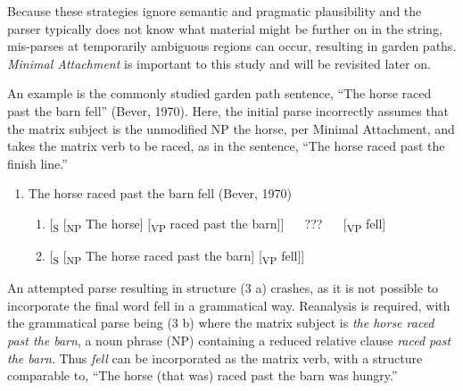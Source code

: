 \documentclass[12pt,oneside]{book}
\providecommand{\tightlist}{%
  \setlength{\itemsep}{0pt}\setlength{\parskip}{0pt}}
\begin{document}
Because these strategies ignore semantic and pragmatic plausibility and the parser typically does not know what material might be further on in the string, mis-parses at temporarily ambiguous regions can occur, resulting in garden paths. \emph{Minimal Attachment}  is important to this study and will be revisited later on.

An example is the commonly studied garden path sentence, ``The horse raced past the barn fell'' (Bever, 1970). Here, the initial parse incorrectly assumes that the matrix subject is the unmodified NP the horse, per Minimal Attachment, and takes the matrix verb to be raced, as in the sentence, ``The horse raced past the finish line.''

\begin{enumerate}
\def\labelenumi{(\arabic{enumi})}
\setcounter{enumi}{2}
\tightlist
\item
  The horse raced past the barn fell (Bever, 1970)

  \begin{enumerate}
  \def\labelenumii{\alph{enumii})}
  \tightlist
  \item
    {[}\textsubscript{S} {[}\textsubscript{NP} The horse{]} {[}\textsubscript{VP} raced past the barn{]}{]}   ???   {[}\textsubscript{VP} fell{]}
  \item
    {[}\textsubscript{S} {[}\textsubscript{NP} The horse raced past the barn{]} {[}\textsubscript{VP} fell{]}{]}
  \end{enumerate}
\end{enumerate}

An attempted parse resulting in structure (3 a) crashes, as it is not possible to incorporate the final word fell in a grammatical way. Reanalysis is required, with the grammatical parse being (3 b) where the matrix subject is \emph{the horse raced past the barn}, a noun phrase (NP) containing a reduced relative clause \emph{raced past the barn}. Thus \emph{fell} can be incorporated as the matrix verb, with a structure comparable to, ``The horse (that was) raced past the barn was hungry.''

\end{document}
